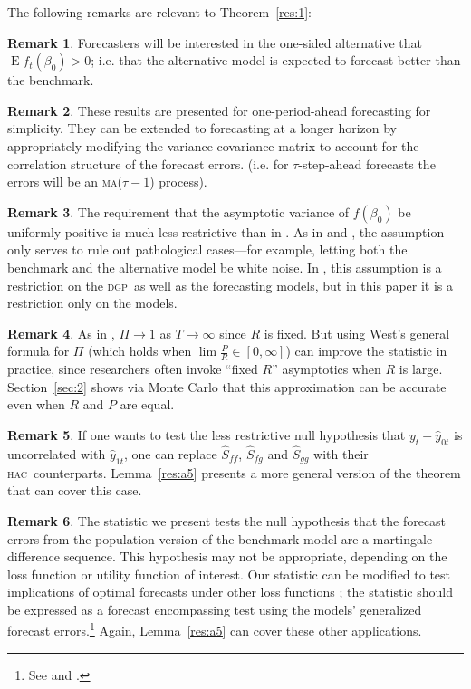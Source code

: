 \documentclass[12pt,fleqn]{article}
\theoremstyle{definition}
\newtheorem{rem}{Remark}
\DeclareMathOperator{\E}{E}
\newcommand{\dgp}{\textsc{dgp}}
\newcommand{\hac}{\textsc{hac}}
\newcommand{\ma}{\textsc{ma}}
\begin{document}
The following remarks are relevant to Theorem~\ref{res:1}:

\begin{rem}
  Forecasters will be interested in the one-sided alternative that $\E
  f_t(\beta_0) > 0$; i.e. that the alternative model is expected to
  forecast better than the benchmark.
\end{rem}

\begin{rem}
  These results are presented for one-period-ahead forecasting for
  simplicity.  They can be extended to forecasting at a longer horizon
  by appropriately modifying the variance-covariance matrix to account
  for the correlation structure of the forecast errors. (i.e. for
  $\tau$-step-ahead forecasts the errors will be an \ma($\tau-1$) process).
\end{rem}

\begin{rem}
  The requirement that the asymptotic variance of $\bar f(\beta_0)$ be
  uniformly positive is much less restrictive than in \cite{Wes:96}.
  As in \cite{GiW:06} and \citet{ClW:06,ClW:07}, the assumption only
  serves to rule out pathological cases---for example, letting both
  the benchmark and the alternative model be white noise. In
  \citet{Wes:96}, this assumption is a restriction on the \dgp\ as
  well as the forecasting models, but in this paper it is a
  restriction only on the models.
\end{rem}

\begin{rem}
  As in \citet{Wes:96}, $\Pi \to 1$ as $T \to \infty$ since $R$ is
  fixed.  But using West's general formula for $\Pi$ (which holds when
  $\lim \tfrac{P}{R} \in [0,\infty]$) can improve the statistic in practice,
  since researchers often invoke ``fixed $R$'' asymptotics when $R$ is
  large.  Section~\ref{sec:2} shows via Monte Carlo that this
  approximation can be accurate even when $R$ and $P$ are equal.
\end{rem}

\begin{rem}
  If one wants to test the less restrictive null hypothesis that
  $y_{t} - \hat{y}_{0t}$ is uncorrelated with $\hat{y}_{1t}$, one can
  replace $\hat{S}_{ff}$, $\hat{S}_{fg}$ and $\hat{S}_{gg}$ with their
  \hac\ counterparts.  Lemma~\ref{res:a5} presents a more general
  version of the theorem that can cover this case.
\end{rem}

\begin{rem}
  The statistic we present tests the null hypothesis that the forecast
  errors from the population version of the benchmark model are a
  martingale difference sequence.  This hypothesis may not be
  appropriate, depending on the loss function or utility function of
  interest.  Our statistic can be modified to test implications of
  optimal forecasts under other loss functions
  \citep[see][]{PaT:07,PaT:07b}; the statistic should be expressed as
  a forecast encompassing test using the models' generalized forecast
  errors.\footnote{See \citet{HLN:98} and \citet[Section~4]{ClW:07}.}
  Again, Lemma~\ref{res:a5} can cover these other applications.
\end{rem}
\end{document}
